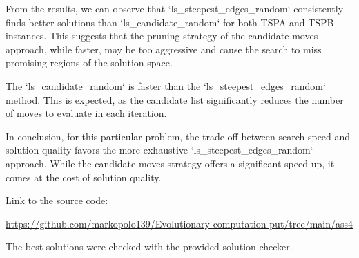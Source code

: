 \documentclass{article}
\begin{document}
From the results, we can observe that `ls\_steepest\_edges\_random` consistently finds better solutions than `ls\_candidate\_random` for both TSPA and TSPB instances. This suggests that the pruning strategy of the candidate moves approach, while faster, may be too aggressive and cause the search to miss promising regions of the solution space.

The `ls\_candidate\_random` is faster than the `ls\_steepest\_edges\_random` method. This is expected, as the candidate list significantly reduces the number of moves to evaluate in each iteration.

In conclusion, for this particular problem, the trade-off between search speed and solution quality favors the more exhaustive `ls\_steepest\_edges\_random` approach. While the candidate moves strategy offers a significant speed-up, it comes at the cost of solution quality.

Link to the source code:

\url{https://github.com/markopolo139/Evolutionary-computation-put/tree/main/ass4}

The best solutions were checked with the provided solution checker.
\end{document}
